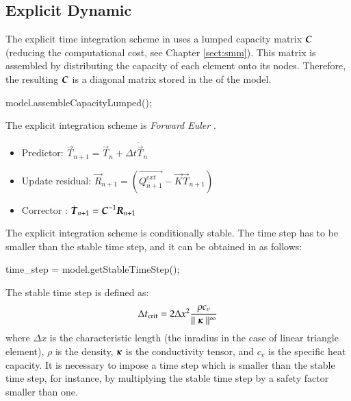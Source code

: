 \subsection{Explicit Dynamic}

The explicit  time integration scheme in \akantu  uses a lumped capacity
matrix $\boldsymbol{C}$ (reducing the computational  cost, see Chapter \ref{sect:smm}).
This matrix is assembled by
distributing the capacity of each element onto its nodes. Therefore, the resulting $\boldsymbol{C}$ is a diagonal matrix stored in the   of the model.

\begin{cpp}
  model.assembleCapacityLumped();
\end{cpp}


The explicit integration scheme is  \emph{Forward Euler}
\cite{curnier92a}.

\begin{itemize}
\item Predictor: $\vec{T}_{n+1} = \vec{T}_{n} + \Delta t \dot{\vec{T}}_{n}$
\item Update residual: $\vec{R}_{n+1} = \left( \vec{Q^{ext}_{n+1}} - \vec{K}\vec{T}_{n+1} \right)$
\item Corrector : $\dot{\boldsymbol{T}}_{n+1} = \boldsymbol{C}^{-1} \boldsymbol{R}_{n+1}$
\end{itemize}

The explicit integration scheme is conditionally stable. The time step has to be smaller than the stable time step,
and it can be obtained in \akantu as follows:

\begin{cpp}
  time_step = model.getStableTimeStep();
\end{cpp}

The stable time step is defined as:
\begin{equation}\label{eqn:htm:explicit:stabletime}
  \Delta t_{{\mathrm{crit}}} = 2 \Delta x^2 \frac{\rho c_v}{\mid\mid \boldsymbol{\kappa} \mid\mid^\infty}
\end{equation}
where $\Delta x$ is the characteristic length (\eg the inradius in the
case of linear triangle element), $\rho$ is the density,
$\boldsymbol{\kappa}$ is the conductivity tensor, and $c_v$ is the specific
heat capacity. It is necessary to impose a time step which is smaller
than the stable time step, for instance, by multiplying the stable
time step by a safety factor smaller than one.


